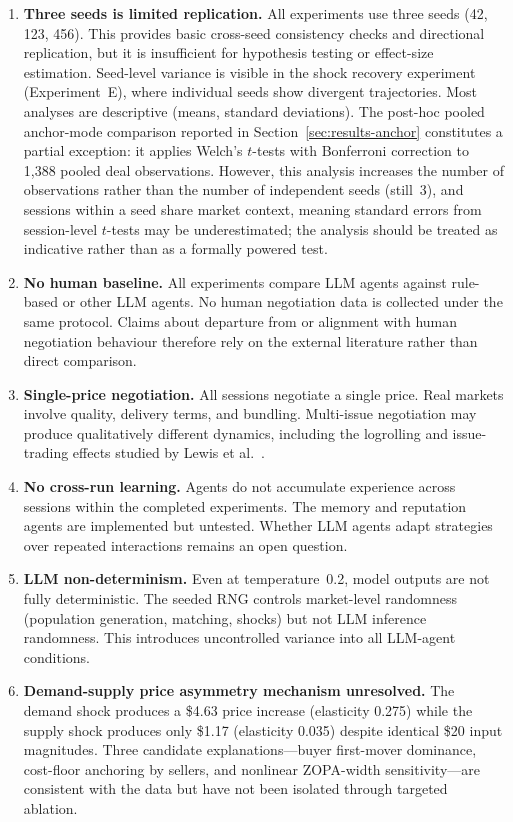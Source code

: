 \begin{enumerate}
    \item \textbf{Three seeds is limited replication.}  All experiments use three seeds (42, 123, 456).  This provides basic cross-seed consistency checks and directional replication, but it is insufficient for hypothesis testing or effect-size estimation.  Seed-level variance is visible in the shock recovery experiment (Experiment~E), where individual seeds show divergent trajectories.  Most analyses are descriptive (means, standard deviations).  The post-hoc pooled anchor-mode comparison reported in Section~\ref{sec:results-anchor} constitutes a partial exception: it applies Welch's $t$-tests with Bonferroni correction to 1{,}388 pooled deal observations.  However, this analysis increases the number of observations rather than the number of independent seeds (still~3), and sessions within a seed share market context, meaning standard errors from session-level $t$-tests may be underestimated; the analysis should be treated as indicative rather than as a formally powered test.

    \item \textbf{No human baseline.}  All experiments compare LLM agents against rule-based or other LLM agents.  No human negotiation data is collected under the same protocol.  Claims about departure from or alignment with human negotiation behaviour therefore rely on the external literature rather than direct comparison.

    \item \textbf{Single-price negotiation.}  All sessions negotiate a single price.  Real markets involve quality, delivery terms, and bundling.  Multi-issue negotiation may produce qualitatively different dynamics, including the logrolling and issue-trading effects studied by Lewis et al.~\cite{lewis2017dealornodeal}.

    \item \textbf{No cross-run learning.}  Agents do not accumulate experience across sessions within the completed experiments.  The memory and reputation agents are implemented but untested.  Whether LLM agents adapt strategies over repeated interactions remains an open question.

    \item \textbf{LLM non-determinism.}  Even at temperature~0.2, model outputs are not fully deterministic.  The seeded RNG controls market-level randomness (population generation, matching, shocks) but not LLM inference randomness.  This introduces uncontrolled variance into all LLM-agent conditions.

    \item \textbf{Demand-supply price asymmetry mechanism unresolved.}  The demand shock produces a \$4.63 price increase (elasticity 0.275) while the supply shock produces only \$1.17 (elasticity 0.035) despite identical \$20 input magnitudes.  Three candidate explanations---buyer first-mover dominance, cost-floor anchoring by sellers, and nonlinear ZOPA-width sensitivity---are consistent with the data but have not been isolated through targeted ablation.
\end{enumerate}
